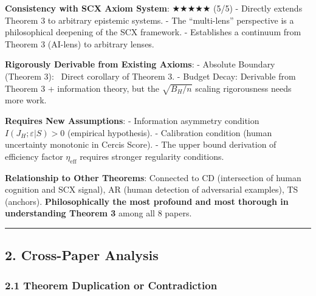 \documentclass[
  12pt,
]{article}
\begin{document}
\textbf{Consistency with SCX Axiom System}: $\bigstar\bigstar\bigstar\bigstar\bigstar$ (5/5)
- Directly extends Theorem 3 to arbitrary epistemic systems.
- The ``multi-lens'' perspective is a philosophical deepening of the SCX framework.
- Establishes a continuum from Theorem 3 (AI-lens) to arbitrary lenses.

\textbf{Rigorously Derivable from Existing Axioms}:
- Absolute Boundary (Theorem 3): \checkmark\ Direct corollary of Theorem 3.
- Budget Decay: Derivable from Theorem 3 + information theory, but the $\sqrt{B_H/n}$ scaling rigorousness needs more work.

\textbf{Requires New Assumptions}:
- Information asymmetry condition $I(J_H;\varepsilon|S)>0$ (empirical hypothesis).
- Calibration condition (human uncertainty monotonic in Cercis Score).
- The upper bound derivation of efficiency factor $\eta_{\text{eff}}$ requires stronger regularity conditions.

\textbf{Relationship to Other Theorems}: Connected to CD (intersection of human cognition and SCX signal), AR (human detection of adversarial examples), TS (anchors). \textbf{Philosophically the most profound and most thorough in understanding Theorem 3} among all 8 papers.

\begin{center}\rule{0.5\linewidth}{0.5pt}\end{center}

\subsection{2. Cross-Paper Analysis}\label{cross-paper-analysis}

\subsubsection{2.1 Theorem Duplication or Contradiction}\label{theorem-duplication-or-contradiction}
\end{document}
